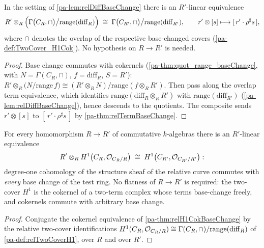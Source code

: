 \begin{theorem}
  \label{pa-thm:relH1CokBaseChange}
  \leanok

  In the setting of \ref{pa-lem:relDiffBaseChange} there is an \(R'\)-linear equivalence
  \[
    R' \otimes_R \Bigl(\Gamma\bigl(C_R, \cap\bigr)\big/\mathrm{range}(\mathrm{diff}_R)\Bigr)
    \;\cong\;
    \Gamma\bigl(C_{R'}, \cap\bigr)\big/\mathrm{range}(\mathrm{diff}_{R'}),
    \qquad r' \otimes [s] \longmapsto [\,r' \cdot \rho^{\sharp} s\,],
  \]
  where \(\cap\) denotes the overlap of the respective base-changed covers
  (\ref{pa-def:TwoCover_H1Cok}). No hypothesis on \(R \to R'\) is needed.
\end{theorem}
\begin{proof}
  \leanok
  Base change commutes with cokernels (\ref{pa-thm:quot_range_baseChange}, with
  \(N = \Gamma(C_R, \cap)\), \(f = \mathrm{diff}_R\), \(S = R'\)):
  \(R' \otimes_R \bigl(N/\mathrm{range}\,f\bigr) \cong (R' \otimes_R N)/
  \mathrm{range}(f \otimes_R R')\). Then pass along the overlap term equivalence, which
  identifies \(\mathrm{range}(\mathrm{diff}_R \otimes_R R')\) with
  \(\mathrm{range}(\mathrm{diff}_{R'})\) (\ref{pa-lem:relDiffBaseChange}), hence descends to
  the quotients. The composite sends \(r' \otimes [s]\) to
  \([\,r' \cdot \rho^{\sharp} s\,]\) by \ref{pa-thm:relTermBaseChange}.
\end{proof}

\begin{theorem}
  \label{pa-thm:relH1BaseChange}
  \leanok

  For every homomorphism \(R \to R'\) of commutative \(k\)-algebras there is an
  \(R'\)-linear equivalence
  \[
    R' \otimes_R H^1\bigl(C_R, \mathcal{O}_{C_R/R}\bigr) \;\cong\;
      H^1\bigl(C_{R'}, \mathcal{O}_{C_{R'}/R'}\bigr) :
  \]
  degree-one cohomology of the structure sheaf of the relative curve commutes with
  \emph{every} base change of the test ring. No flatness of \(R \to R'\) is required:
  the two-cover \(H^1\) is the cokernel of a two-term complex whose terms base-change
  freely, and cokernels commute with arbitrary base change.
\end{theorem}
\begin{proof}
  \leanok
  Conjugate the cokernel equivalence of \ref{pa-thm:relH1CokBaseChange} by the relative
  two-cover identifications \(H^1(C_R, \mathcal{O}_{C_R/R}) \cong
  \Gamma(C_R, \cap)/\mathrm{range}(\mathrm{diff}_R)\) of \ref{pa-def:relTwoCoverH1}, over
  \(R\) and over \(R'\).
\end{proof}

